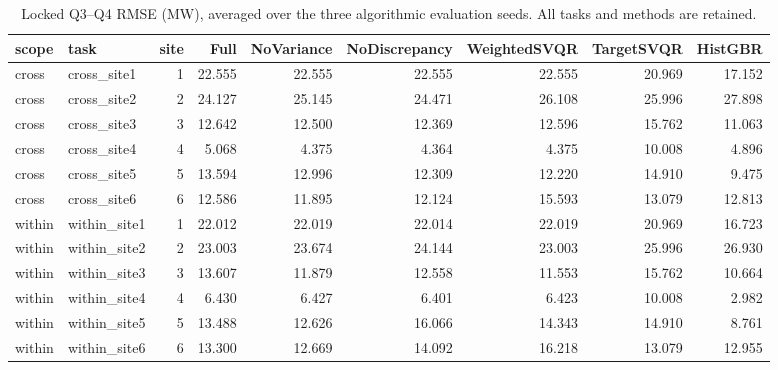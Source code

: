 \begin{table}
\caption{Locked Q3--Q4 RMSE (MW), averaged over the three algorithmic evaluation seeds. All tasks and methods are retained.}
\label{tab:selection-v2-task-rmse}
\begin{tabular}{llrrrrrrr}
\toprule
scope & task & site & Full & NoVariance & NoDiscrepancy & WeightedSVQR & TargetSVQR & HistGBR \\
\midrule
cross & cross\_site1 & 1 & 22.555 & 22.555 & 22.555 & 22.555 & 20.969 & 17.152 \\
cross & cross\_site2 & 2 & 24.127 & 25.145 & 24.471 & 26.108 & 25.996 & 27.898 \\
cross & cross\_site3 & 3 & 12.642 & 12.500 & 12.369 & 12.596 & 15.762 & 11.063 \\
cross & cross\_site4 & 4 & 5.068 & 4.375 & 4.364 & 4.375 & 10.008 & 4.896 \\
cross & cross\_site5 & 5 & 13.594 & 12.996 & 12.309 & 12.220 & 14.910 & 9.475 \\
cross & cross\_site6 & 6 & 12.586 & 11.895 & 12.124 & 15.593 & 13.079 & 12.813 \\
within & within\_site1 & 1 & 22.012 & 22.019 & 22.014 & 22.019 & 20.969 & 16.723 \\
within & within\_site2 & 2 & 23.003 & 23.674 & 24.144 & 23.003 & 25.996 & 26.930 \\
within & within\_site3 & 3 & 13.607 & 11.879 & 12.558 & 11.553 & 15.762 & 10.664 \\
within & within\_site4 & 4 & 6.430 & 6.427 & 6.401 & 6.423 & 10.008 & 2.982 \\
within & within\_site5 & 5 & 13.488 & 12.626 & 16.066 & 14.343 & 14.910 & 8.761 \\
within & within\_site6 & 6 & 13.300 & 12.669 & 14.092 & 16.218 & 13.079 & 12.955 \\
\bottomrule
\end{tabular}
\end{table}

